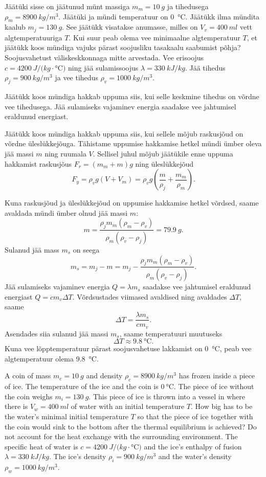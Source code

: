 
Jäätüki sisse on jäätunud münt massiga $m_m=\SI{10}{g}$ ja tihedusega $\rho_m=\SI{8900}{kg/m^3}$. Jäätüki ja mündi temperatuur on \SI{0}{\degreeCelsius}. Jäätükk ilma mündita kaalub $m_j=\SI{130}{g}$. See jäätükk visatakse anumasse, milles on $V_v=\SI{400}{ml}$ vett algtemperatuuriga $T$. Kui suur peab olema vee minimaalne algtemperatuur $T$, et jäätükk koos mündiga vajuks pärast soojusliku tasakaalu saabumist põhja? Soojusvahetust väliskeskkonnaga mitte arvestada. Vee erisoojus $c=\SI{4200}{J/ (kg\cdot\degreeCelsius)}$ ning jää sulamissoojus $\lambda=\SI{330}{kJ/kg}$. Jää tihedus $\rho_j=\SI{900}{kg/m^3}$ ja vee tihedus $\rho_v=\SI{1000}{kg/m^3}$.

\hint
Jäätükk koos mündiga hakkab uppuma siis, kui selle keskmine tihedus on võrdne vee tihedusega. Jää sulamiseks vajaminev energia saadakse vee jahtumisel eraldunud energiast.

\solu
Jäätükk koos mündiga hakkab uppuma siis, kui sellele mõjub raskusjõud on võrdne üleslükkejõuga. Tähistame uppumise hakkamise hetkel mündi ümber oleva jää massi $m$ ning ruumala $V$. Sellisel juhul mõjub jäätükile enne uppuma hakkamist raskusjõus $F_r=(m_m+m)g$ ning üleslükkejõud
\[ F_y=\rho_v g(V + V_m)=\rho_v g\left(\frac{m}{\rho_j} + \frac{m_m}{\rho_m}\right). \]

Kuna raskusjõud ja üleslükkejõud on uppumise hakkamise hetkel võrdsed, saame avaldada mündi ümber olnud jää massi $m$:
\[ m = \frac{\rho_j m_m(\rho_m - \rho_v)}{\rho_m(\rho_v - \rho_j)} = \SI{79,9}{g}. \]
Sulanud jää mass $m_s$ on seega
\[ m_s = m_j - m = m_j - \frac{\rho_j m_m(\rho_m - \rho_v)}{\rho_m(\rho_v - \rho_j)}. \]
Jää sulamiseks vajaminev energia $Q=\lambda m_s$ saadakse vee jahtumisel eraldunud energiast $Q=cm_v\Delta T$. Võrdsustades viimased avaldised ning avaldades $\Delta T$, saame
\[ \Delta T = \frac{\lambda m_s}{cm_v}. \]
Asendades siia sulanud jää massi $m_s$, saame temperatuuri muutuseks
\[ \Delta T \approx \SI{9,8}{\degreeCelsius}. \]
Kuna vee lõpptemperatuur pärast soojusvahetuse lakkamist on \SI{0}{\degreeCelsius}, peab vee algtemperatuur olema \SI{9,8}{\degreeCelsius}.

A coin of mass $m_c=\SI{10}{g}$ and density $\rho_c=\SI{8900}{kg/m^3}$ has frozen inside a piece of ice. The temperature of the ice and the coin is $\SI{0}{\degreeCelsius}$. The piece of ice without the coin weighs $m_i=\SI{130}{g}$. This piece of ice is thrown into a vessel in where there is $V_w=\SI{400}{ml}$ of water with an initial temperature $T$. How big has to be the water’s minimal initial temperature $T$ so that the piece of ice together with the coin would sink to the bottom after the thermal equilibrium is achieved? Do not account for the heat exchange with the surrounding environment. The specific heat of water is $c=\SI{4200}{J/ (kg\cdot\degreeCelsius)}$ and the ice’s enthalpy of fusion $\lambda=\SI{330}{kJ/kg}$. The ice’s density $\rho_i=\SI{900}{kg/m^3}$ and the water’s density $\rho_w=\SI{1000}{kg/m^3}$.

